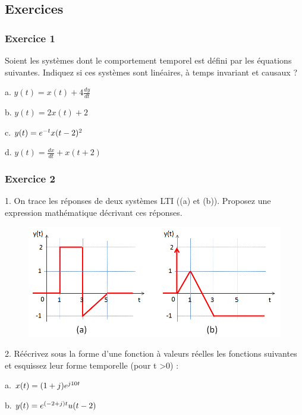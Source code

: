 \begin{remark}{}
	\vspace{1\baselineskip}

	
	
	\section{Exercices}
	
	\subsubsection{Exercice 1} 
	Soient les systèmes dont le comportement temporel est défini
        par les équations suivantes. Indiquez si ces systèmes sont
        linéaires, à temps invariant et causaux ?
	
	a. $y(t) = x(t)+4\frac{dy}{dt}$
	
	b. $y(t) = 2x(t)+2$
	
	c. $y(t)=e^{-t}x(t-2)^{2}$
	
	d. $y(t)=\frac{dx}{dt}+x(t+2)$
	
	\vspace{1\baselineskip}
	
	\subsubsection{Exercice 2} 
	1. On trace les réponses de deux systèmes LTI ((a) et
        (b)). Proposez une expression mathématique décrivant ces
        réponses.
	\begin{figure}[htbp]
          \centering \includegraphics[scale=0.5]{images/Exo_2_2.jpg}
	\end{figure}

	
	2. Réécrivez sous la forme d'une fonction à valeurs réelles
        les fonctions suivantes et esquissez leur forme temporelle
        (pour t >0) :
	
	a. $x(t) = (1+j)e^{j 10t}$
	
	b. $y(t) = e^{(-2+j)t} u(t-2)$
	

\end{remark}
